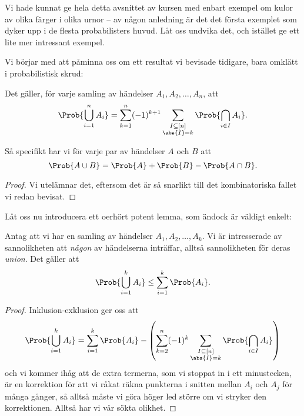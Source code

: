 \documentclass[nobib]{tufte-handout}
\begin{document}
Vi hade kunnat ge hela detta avsnittet av kursen med enbart exempel om kulor av olika färger i olika urnor -- av någon anledning är det det första exemplet som dyker upp i de flesta probabilisters huvud. Låt oss undvika det, och istället ge ett lite mer intressant exempel.

Vi börjar med att påminna oss om ett resultat vi bevisade tidigare, bara omklätt i probabilistisk skrud:

\begin{lemma}
    Det gäller, för varje samling av händelser $A_1, A_2, \ldots, A_n$, att
    $$\Prob{\bigcup_{i=1}^n A_i} = \sum_{k=1}^{n} (-1)^{k+1}\sum_{\substack{I \subseteq [n]\\\abs{I} = k}} \Prob{\bigcap_{i\in I} A_i}.$$

    Så specifikt har vi för varje par av händelser $A$ och $B$ att
    $$\Prob{A \cup B} = \Prob{A} + \Prob{B} - \Prob{A \cap B}.$$

    \begin{proof}
        Vi utelämnar det, eftersom det är så snarlikt till det kombinatoriska fallet vi redan bevisat.
    \end{proof}
\end{lemma}

Låt oss nu introducera ett oerhört potent lemma, som ändock är väldigt enkelt:

\begin{lemma}[Unionsbegränsning]\label{union_bound}
    Antag att vi har en samling av händelser $A_1, A_2, \ldots, A_k$. Vi är intresserade av sannolikheten att \emph{någon} av händelserna inträffar, alltså sannolikheten för deras \emph{union}. Det gäller att
    $$\Prob{\bigcup_{i=1}^k A_i} \leq \sum_{i=1}^{k} \Prob{A_i}.$$

    \begin{proof}
        Inklusion-exklusion ger oss att
        $$\Prob{\bigcup_{i=1}^k A_i} = \sum_{i=1}^{k} \Prob{A_i} - \left(\sum_{k=2}^{n} (-1)^{k}\sum_{\substack{I \subseteq [n]\\\abs{I} = k}} \Prob{\bigcap_{i\in I} A_i}\right)$$
        och vi kommer ihåg att de extra termerna, som vi stoppat in i ett minustecken, är en korrektion för att vi råkat räkna punkterna i snitten mellan $A_i$ och $A_j$ för många gånger, så alltså måste vi göra höger led större om vi stryker den korrektionen. Alltså har vi vår sökta olikhet.
    \end{proof}
\end{lemma}
\end{document}
